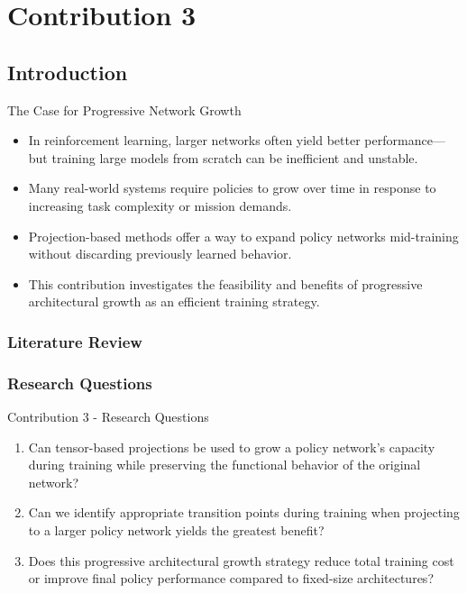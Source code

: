\section{Contribution 3}

\subsection{Introduction}

\begin{frame}{The Case for Progressive Network Growth}
    \begin{itemize}
        \item In reinforcement learning, larger networks often yield better performance—but 
            training large models from scratch can be inefficient and unstable.
        \item Many real-world systems require policies to grow over time in response to 
            increasing task complexity or mission demands.
        \item Projection-based methods offer a way to expand policy networks mid-training 
            without discarding previously learned behavior.
        \item This contribution investigates the feasibility and benefits of progressive 
            architectural growth as an efficient training strategy.
    \end{itemize}
\end{frame}

\subsubsection{Literature Review}

\subsubsection{Research Questions}

\begin{frame}{Contribution 3 - Research Questions}
    \begin{enumerate}
        \item[RQ 1] {
            Can tensor-based projections be used to grow a policy network's capacity during 
            training while preserving the functional behavior of the original network?}
        \item[RQ 2] {
            Can we identify appropriate transition points during training when projecting 
            to a larger policy network yields the greatest benefit?}
        \item[RQ 3] {
            Does this progressive architectural growth strategy reduce total training cost 
            or improve final policy performance compared to fixed-size architectures?}
    \end{enumerate}
\end{frame}

